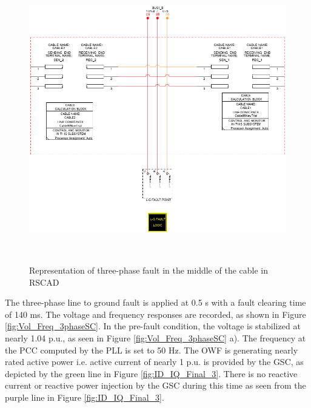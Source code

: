 \begin{figure}[H]
\centering
    \includegraphics[height = 12.5cm,width = 13.5cm]{Diagrams/Chapter_3/2CablesBlockWithFault.png}
    \caption{Representation of three-phase fault in the middle of the cable in RSCAD}
    \label{fig:2cablesblockwithfault}
\end{figure}

The three-phase line to ground fault is applied at 0.5 s with a fault clearing time of 140 ms. The voltage and frequency responses are recorded, as shown in Figure \ref{fig:Vol_Freq_3phaseSC}. In the pre-fault condition, the voltage is stabilized at nearly 1.04 p.u., as seen in Figure \ref{fig:Vol_Freq_3phaseSC} a). 
The frequency at the \gls{PCC} computed by the \gls{PLL} is set to 50 Hz.
The \gls{OWF} is generating nearly rated active power i.e. active current of nearly 1 p.u. is provided by the \gls{GSC}, as depicted by the green line in Figure \ref{fig:ID_IQ_Final_3}. There is no reactive current or reactive power injection by the \gls{GSC} during this time as seen from the purple line in Figure \ref{fig:ID_IQ_Final_3}. 

